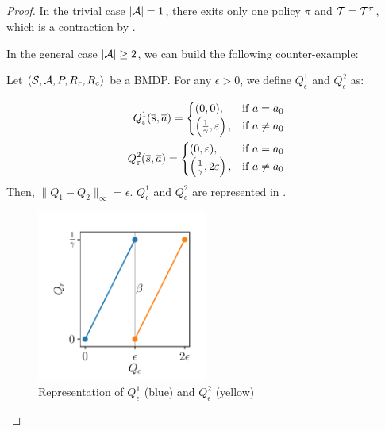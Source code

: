 \subsection{}
\label{sec:proof_contraction}
\begin{proof}
In the trivial case $|\mathcal{A}| = 1$, there exits only one policy $\pi$ and $\mathcal{T} = \mathcal{T}^\pi$, which is a contraction by .

In the general case $|\mathcal{A}| \geq 2$, we can build the following counter-example:

Let $(\mathcal{S}, \mathcal{A}, P, R_r, R_c)$ be a BMDP.
For any $\epsilon > 0$, we define $Q_\epsilon^1$ and $Q_\epsilon^2$ as:

\begin{align*}
      Q_\varepsilon^1(\overline{s},\overline{a}) =
      \begin{cases}
    (0, 0), & \text{if } a = a_0 \\
    \left(\frac{1}{\gamma}, \varepsilon\right), & \text{if } a \neq a_0
  \end{cases}\\
  Q_\varepsilon^2(\overline{s},\overline{a}) =
      \begin{cases}
    (0, \varepsilon), & \text{if } a = a_0 \\
    \left(\frac{1}{\gamma}, 2\varepsilon\right), & \text{if } a \neq a_0
  \end{cases}
\end{align*}
Then, $\|Q_1-Q_2\|_\infty = \epsilon$.
 $Q_\epsilon^1$ and $Q_\epsilon^2$ are represented in .

\begin{figure}[tp]
    \centering
    \includegraphics[width=0.5\textwidth]{source/img/concavity_example.pdf}
    \caption{Representation of $Q_\epsilon^1$ (blue) and $Q_\epsilon^2$ (yellow)}
    \label{fig:concavity_example}
\end{figure}


\end{proof}
